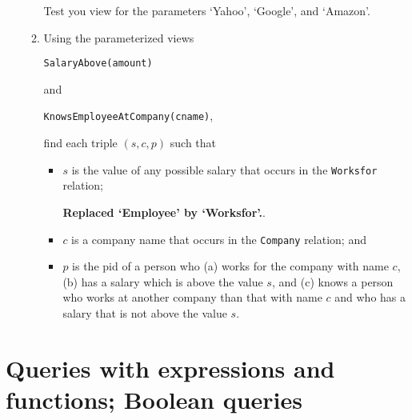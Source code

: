\begin{enumerate}
\begin{enumerate}
Test you view for the parameters `Yahoo', `Google', and `Amazon'.

\item Using the parameterized views 
\begin{center}{{\tt SalaryAbove(amount)}} \end{center}
%
and 
\begin{center}{{\tt KnowsEmployeeAtCompany(cname)},} \end{center}
%
find each triple $(s,c,p)$ such that 
\begin{itemize}
\item $s$ is the value of any possible salary that occurs in the {\tt Worksfor} relation;

{\bf Replaced `Employee' by `Worksfor'.}.


\item $c$ is a company name that occurs in the {\tt Company} relation; and
\item $p$ is the pid of a person who (a) works for the company with name $c$, (b) has a salary which
is above the value $s$, and (c) knows a person
who works at another company than that with name $c$ and who has a salary that is not above the value $s$.
\end{itemize}
\end{enumerate}

\end{enumerate} 
\newpage
\section{Queries with expressions and functions; Boolean queries}

